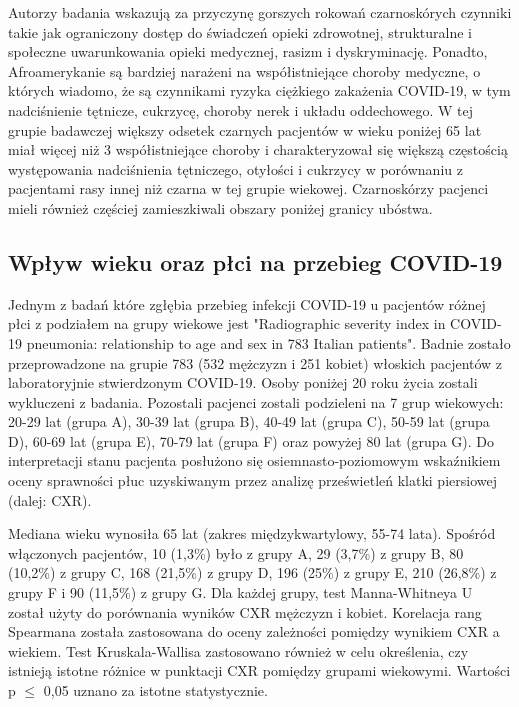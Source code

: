 \documentclass[polish, twoside, 12pt, a4paper]{article}
\theoremstyle{definition}
\theoremstyle{plain}
\theoremstyle{remark}
\begin{document}
Autorzy badania wskazują za przyczynę gorszych rokowań czarnoskórych czynniki takie jak ograniczony dostęp do świadczeń opieki zdrowotnej, strukturalne i społeczne uwarunkowania opieki medycznej, rasizm i dyskryminację. Ponadto, Afroamerykanie są bardziej narażeni na współistniejące choroby medyczne, o których wiadomo, że są czynnikami ryzyka ciężkiego zakażenia COVID-19, w tym nadciśnienie tętnicze, cukrzycę, choroby nerek i układu oddechowego. W tej grupie badawczej większy odsetek czarnych pacjentów w wieku poniżej 65 lat miał więcej niż 3 współistniejące choroby i charakteryzował się większą częstością występowania nadciśnienia tętniczego, otyłości i cukrzycy w porównaniu z pacjentami rasy innej niż czarna w tej grupie wiekowej. Czarnoskórzy pacjenci mieli również częściej zamieszkiwali obszary poniżej granicy ubóstwa. \cite{borghesi2020}

\subsection{Wpływ wieku oraz płci na przebieg COVID-19}

Jednym z badań które zgłębia przebieg infekcji COVID-19 u pacjentów różnej płci z podziałem na grupy wiekowe jest "Radiographic severity index in COVID-19 pneumonia: relationship to age and sex in 783 Italian patients". Badnie zostało przeprowadzone na grupie 783 (532 mężczyzn i 251 kobiet) włoskich pacjentów z laboratoryjnie stwierdzonym COVID-19. Osoby poniżej 20 roku życia zostali wykluczeni z badania. Pozostali pacjenci zostali podzieleni na 7 grup wiekowych: 20-29 lat (grupa A), 30-39 lat (grupa B), 40-49 lat (grupa C), 50-59 lat (grupa D), 60-69 lat (grupa E), 70-79 lat (grupa F) oraz powyżej 80 lat (grupa G). Do interpretacji stanu pacjenta posłużono się osiemnasto-poziomowym wskaźnikiem oceny sprawności płuc uzyskiwanym przez analizę prześwietleń klatki piersiowej (dalej: CXR).

Mediana wieku wynosiła 65 lat (zakres międzykwartylowy, 55-74 lata). Spośród włączonych pacjentów, 10 (1,3\%) było z grupy A, 29 (3,7\%) z grupy B, 80 (10,2\%) z grupy C, 168 (21,5\%) z grupy D, 196 (25\%) z grupy E, 210 (26,8\%) z grupy F i 90 (11,5\%) z grupy G. Dla każdej grupy, test Manna-Whitneya U został użyty do porównania wyników CXR mężczyzn i kobiet. Korelacja rang Spearmana została zastosowana do oceny zależności pomiędzy wynikiem CXR a wiekiem. Test Kruskala-Wallisa zastosowano również w celu określenia, czy istnieją istotne różnice w punktacji CXR pomiędzy grupami wiekowymi. Wartości p $\leq$ 0,05 uznano za istotne statystycznie.
\end{document}
